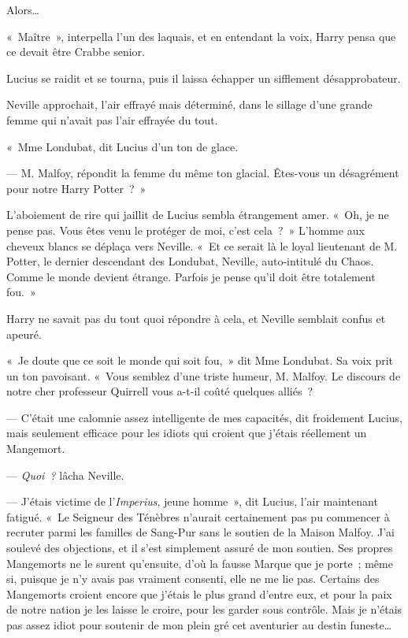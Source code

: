Alors…

«~Maître~», interpella l'un des laquais, et en entendant la voix, Harry pensa que ce devait être Crabbe senior.

Lucius se raidit et se tourna, puis il laissa échapper un sifflement désapprobateur.

Neville approchait, l'air effrayé mais déterminé, dans le sillage d'une grande femme qui n'avait pas l'air effrayée du tout.

«~Mme Londubat, dit Lucius d'un ton de glace.

--- M. Malfoy, répondit la femme du même ton glacial. Êtes-vous un désagrément pour notre Harry Potter~?~»

L'aboiement de rire qui jaillit de Lucius sembla étrangement amer. «~Oh, je ne pense pas. Vous êtes venu le protéger de moi, c'est cela~?~» L'homme aux cheveux blancs se déplaça vers Neville. «~Et ce serait là le loyal lieutenant de M. Potter, le dernier descendant des Londubat, Neville, auto-intitulé du Chaos. Comme le monde devient étrange. Parfois je pense qu'il doit être totalement fou.~»

Harry ne savait pas du tout quoi répondre à cela, et Neville semblait confus et apeuré.

«~Je doute que ce soit le monde qui soit fou,~» dit Mme Londubat. Sa voix prit un ton pavoisant. «~Vous semblez d'une triste humeur, M. Malfoy. Le discours de notre cher professeur Quirrell vous a-t-il coûté quelques alliés~?

--- C'était une calomnie assez intelligente de mes capacités, dit froidement Lucius, mais seulement efficace pour les idiots qui croient que j'étais réellement un Mangemort.

--- \emph{Quoi~?} lâcha Neville.

--- J'étais victime de l'\emph{Imperius}, jeune homme~», dit Lucius, l'air maintenant fatigué. «~Le Seigneur des Ténèbres n'aurait certainement pas pu commencer à recruter parmi les familles de Sang-Pur sans le soutien de la Maison Malfoy. J'ai soulevé des objections, et il s'est simplement assuré de mon soutien. Ses propres Mangemorts ne le surent qu'ensuite, d'où la fausse Marque que je porte~; même si, puisque je n'y avais pas vraiment consenti, elle ne me lie pas. Certains des Mangemorts croient encore que j'étais le plus grand d'entre eux, et pour la paix de notre nation je les laisse le croire, pour les garder sous contrôle. Mais je n'étais pas assez idiot pour soutenir de mon plein gré cet aventurier au destin funeste…

